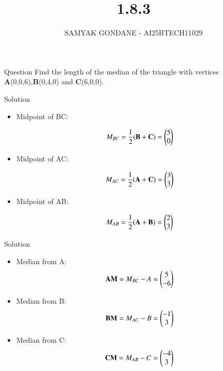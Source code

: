 \documentclass{beamer}
\title 
{1.8.3}
\date{}
\author
{SAMYAK GONDANE - AI25BTECH11029}
\begin{document}
\frame{\titlepage}
\begin{frame}{Question}
Find the length of the median of the triangle with vertices \textbf{A}(0,0,6),\textbf{B}(0,4,0) and \textbf{C}(6,0,0).
\end{frame}



\vspace{0.5cm}

\begin{frame}{Solution}
\begin{itemize}
    \item Midpoint of BC:
    

\begin{align}
    M_{BC} = \frac{1}{2}(\mathbf{B} + \mathbf{C}) = \begin{pmatrix}5 \\ 0\end{pmatrix}
    \end{align}


    \item Midpoint of AC:
    

\begin{align}
    M_{AC} = \frac{1}{2}(\mathbf{A} + \mathbf{C}) = \begin{pmatrix}3 \\ 3\end{pmatrix}
    \end{align}


    \item Midpoint of AB:
    

\begin{align}
    M_{AB} = \frac{1}{2}(\mathbf{A} + \mathbf{B}) = \begin{pmatrix}2 \\ 3\end{pmatrix}
    \end{align}


\end{itemize}
\end{frame}


\begin{frame}{Solution}
\begin{itemize}
    \item Median from A: \begin{align} \mathbf{AM} = M_{BC} - A = \begin{pmatrix}5 \\ -6\end{pmatrix} \end{align}
    \item Median from B: \begin{align} \mathbf{BM} = M_{AC} - B = \begin{pmatrix}-1 \\ 3\end{pmatrix} \end{align}
    \item Median from C: \begin{align} \mathbf{CM} = M_{AB} - C = \begin{pmatrix}-4 \\ 3\end{pmatrix} \end{align}
\end{itemize}
\end{frame}
\end{document}
